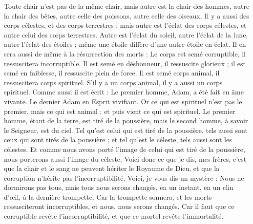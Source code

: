 \begin{multicols}{2}
Toute chair n'est pas de la même chair, mais autre est la chair des hommes, autre la chair des bêtes, autre celle des poissons, autre celle des oiseaux.
Il y a aussi des corps célestes, et des corps terrestres ; mais autre est l’éclat des corps célestes, et autre celui des corps terrestres.
Autre est l’éclat du soleil, autre l’éclat de la lune, autre l’éclat des étoiles ; même une étoile diffère d'une autre étoile en éclat.
Il en sera aussi de même à la résurrection des morts : Le corps est semé corruptible, il ressuscitera incorruptible.
Il est semé en déshonneur, il ressuscite glorieux ; il est semé en faiblesse, il ressuscite plein de force.
Il est semé corps animal, il ressuscitera corps spirituel. S’il y a un corps animal, il y a aussi un corps spirituel.
Comme aussi il est écrit : Le premier homme, Adam, a été fait en âme vivante. Le dernier Adam en Esprit vivifiant.
Or ce qui est spirituel n'est pas le premier, mais ce qui est animal ; et puis vient ce qui est spirituel.
Le premier homme, étant de la terre, est tiré de la poussière, mais le second homme, à savoir le Seigneur, est du ciel.
Tel qu'est celui qui est tiré de la poussière, tels aussi sont ceux qui sont tirés de la poussière ; et tel qu'est le céleste, tels aussi sont les célestes.
Et comme nous avons porté l'image de celui qui est tiré de la poussière, nous porterons aussi l'image du céleste.
Voici donc ce que je dis, mes frères, c'est que la chair et le sang ne peuvent hériter le Royaume de Dieu, et que la corruption n'hérite pas l'incorruptibilité.
Voici, je vous dis un mystère : Nous ne dormirons pas tous, mais tous nous serons changés,
en un instant, en un clin d’œil, à la dernière trompette. Car la trompette sonnera, et les morts ressusciteront incorruptibles, et nous, nous serons changés.
Car il faut que ce corruptible revête l'incorruptibilité, et que ce mortel revête l'immortalité.

\end{multicols}
